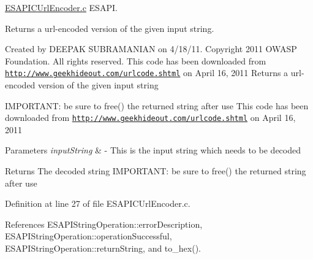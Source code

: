 \hyperlink{a00023}{ESAPICUrlEncoder.c} ESAPI. 

Returns a url-\/encoded version of the given input string.

Created by DEEPAK SUBRAMANIAN on 4/18/11. Copyright 2011 OWASP Foundation. All rights reserved. This code has been downloaded from \href{http://www.geekhideout.com/urlcode.shtml}{\tt http://www.geekhideout.com/urlcode.shtml} on April 16, 2011 Returns a url-\/encoded version of the given input string

IMPORTANT: be sure to free() the returned string after use This code has been downloaded from \href{http://www.geekhideout.com/urlcode.shtml}{\tt http://www.geekhideout.com/urlcode.shtml} on April 16, 2011


\begin{DoxyParams}{Parameters}
{\em inputString} & -\/ This is the input string which needs to be decoded \\
\hline
\end{DoxyParams}
\begin{DoxyReturn}{Returns}
The decoded string IMPORTANT: be sure to free() the returned string after use 
\end{DoxyReturn}


Definition at line 27 of file ESAPICUrlEncoder.c.



References ESAPIStringOperation::errorDescription, ESAPIStringOperation::operationSuccessful, ESAPIStringOperation::returnString, and to\_\-hex().

